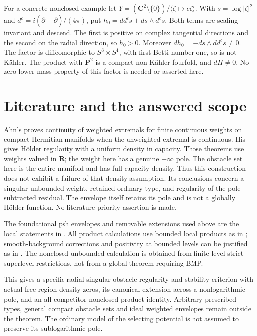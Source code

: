 \documentclass[11pt]{article}
\newcommand{\D}{dd^c}
\theoremstyle{remark}\newtheorem{remark}[theorem]{Remark}
\begin{document}
For a concrete nonclosed example let
$Y=(\mathbf C^2\setminus\{0\})/\langle\zeta\mapsto e\zeta\rangle$.
With $s=\log|\zeta|^2$ and $d^c=i(\bar\partial-\partial)/(4\pi)$, put
$h_0=\D s+ds\wedge d^cs$. Both terms are scaling-invariant and descend.
The first is positive on complex tangential directions and the
second on the radial direction, so $h_0>0$.
Moreover $dh_0=-ds\wedge\D s\ne0$.
The factor is diffeomorphic to $S^3\times S^1$, with first Betti
number one, so is not K\"ahler. The product with $\mathbf P^2$ is a
compact non-K\"ahler fourfold, and $dH\ne0$. No zero-lower-mass
property of this factor is needed or asserted here.

\section{Literature and the answered scope}
Ahn's \cite[Theorem 1.4(ii)]{AhnC} proves continuity of weighted
extremals for finite continuous weights on compact Hermitian manifolds
when the unweighted extremal is continuous. His
\cite[Theorem 1.1(ii)]{AhnH} gives H\"older regularity with a uniform
density in capacity. Those theorems use weights valued in $\mathbf R$;
the weight here has a genuine $-\infty$ pole. The obstacle set here
is the entire manifold and has full capacity density. Thus this
construction does not exhibit a failure of that density assumption.
Its conclusions concern a singular unbounded weight, retained
ordinary type, and regularity of the pole-subtracted residual. The
envelope itself retains its pole and is not a globally H\"older
function. No literature-priority assertion is made.

The foundational psh envelopes and removable extensions used above
are the local statements in \cite[Chapter I, Sections 4--5]{Dem}.
All product calculations use bounded local products as in
\cite[Section 2]{BT}; smooth-background corrections and positivity
at bounded levels can be justified as in
\cite[Section 2.1, Proposition 2.1]{BGL}. The nonclosed unbounded
calculation is obtained from finite-level strict-superlevel
restrictions, not from a global theorem requiring BMP.

This gives a specific radial singular-obstacle regularity and
stability criterion with actual free-region density zeros, its
canonical extension across a nonlogarithmic pole, and an all-competitor
nonclosed product identity. Arbitrary prescribed types, general
compact obstacle sets and ideal weighted envelopes remain outside
the theorem. The ordinary model of the selecting potential is not
assumed to preserve its sublogarithmic pole.
\end{document}
